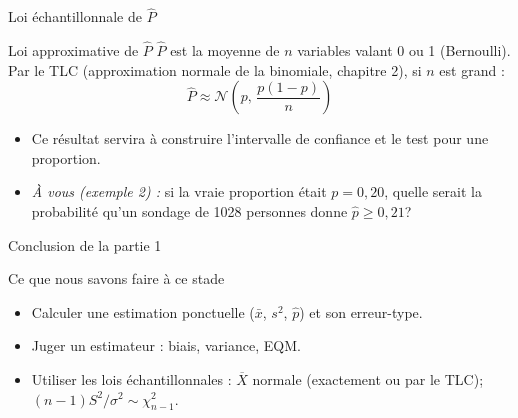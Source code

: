 \documentclass{BeamerTemplate}
\begin{document}
\begin{frame}[t]{Loi échantillonnale de $\widehat{P}$}
  \begin{Boite}{Loi approximative de $\widehat{P}$}
    $\widehat{P}$ est la moyenne de $n$ variables valant 0 ou 1 (Bernoulli). Par le \alert{TLC} (approximation normale de la binomiale, chapitre 2), si $n$ est grand :
    $$\widehat{P} \approx \mathcal{N}\!\left(p,\, \frac{p(1-p)}{n}\right)$$
  \end{Boite}

  \medskip
  \begin{itemize}\itemsep 3mm
    \item Ce résultat servira à construire l'intervalle de confiance et le test pour une proportion.
    \item \emph{À vous (exemple 2) :} si la vraie proportion était $p = 0{,}20$, quelle serait la probabilité qu'un sondage de 1028 personnes donne $\hat{p} \ge 0{,}21$?
  \end{itemize}
\end{frame}

\begin{frame}[t]{Conclusion de la partie 1}
  \begin{Boite}{Ce que nous savons faire à ce stade}
    \begin{itemize}
      \item Calculer une \alert{estimation ponctuelle} ($\bar{x}$, $s^2$, $\hat{p}$) et son \alert{erreur-type}.
      \item Juger un estimateur : \alert{biais}, \alert{variance}, \alert{EQM}.
      \item Utiliser les \alert{lois échantillonnales} : $\overline{X}$ normale (exactement ou par le TLC); $(n-1)S^2/\sigma^2 \sim \chi^2_{n-1}$.
    \end{itemize}
  \end{Boite}

  \medskip
\end{frame}
\end{document}
